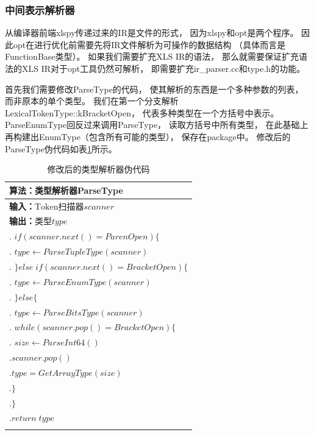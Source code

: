 \subsubsection{中间表示解析器}\label{ir_parser}

从编译器前端xlspy传递过来的IR是文件的形式，
因为xlspy和opt是两个程序。
因此opt在进行优化前需要先将IR文件解析为可操作的数据结构
（具体而言是FunctionBase类型）。
如果我们需要扩充XLS IR的语法，
那么就需要保证扩充语法的XLS IR对于opt工具仍然可解析，
即需要扩充ir\_parser.cc和type.h的功能。

首先我们需要修改ParseType的代码，
使其解析的东西是一个多种参数的列表，
而非原本的单个类型。
我们在第一个分支解析LexicalTokenType::kBracketOpen，
代表多种类型在一个方括号中表示。
ParseEnumType回反过来调用ParseType，
读取方括号中所有类型，
在此基础上再构建出EnumType（包含所有可能的类型），
保存在package中。
修改后的ParseType伪代码如表\ref{alg.parsetype}所示。

\begin{table}
\begin{flushleft}
    \caption{修改后的类型解析器伪代码}
    \label{alg.parsetype}
    \begin{tabular*}{\hsize}{@{}@{\extracolsep{\fill}}l@{}}
        \Xhline{3\arrayrulewidth}
        \;\textbf{算法：}类型解析器ParseType \\
        \hline

        \;\textbf{输入：}$\text{Token扫描器}scanner$ \\
        \;\textbf{输出：}$\text{类型}type$ \\
        \;1. $if (scanner.next() = ParenOpen) \{$ \\
        \;2. \quad$type \gets ParseTupleType(scanner)$ \\
        \;3. $\} else\;if (scanner.next() = BracketOpen) \{$ \\
        \;4. \quad$type \gets ParseEnumType(scanner)$ \\
        \;5. $\} else \{$ \\
        \;6. \quad$type \gets ParseBitsType(scanner)$ \\
        \;8. \quad$while (scanner.pop() = BracketOpen) \{$\\
        \;9. \quad\quad$size \gets ParseInt64()$ \\
        \;10.\quad\quad$scanner.pop()$ \\
        \;11.\quad\quad$type = GetArrayType(size)$ \\
        \;12.\quad$\}$ \\
        \;13.$\}$ \\
        \;14.$return\;type$ \\

        \Xhline{3\arrayrulewidth}
    \end{tabular*}
\end{flushleft}
\end{table}


